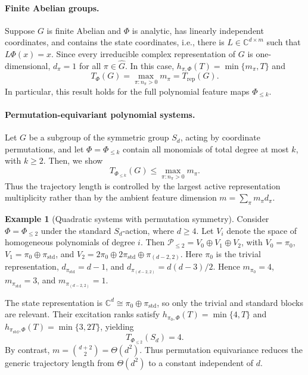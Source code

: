 \documentclass[11pt]{article}
\theoremstyle{plain}
\theoremstyle{definition}
\newtheorem{example}[theorem]{Example}
\theoremstyle{remark}
\begin{document}
\paragraph{Finite Abelian groups.}
Suppose \(G\) is finite Abelian and \(\Phi\) is analytic, has linearly
independent coordinates, and contains the state coordinates, i.e., there is
\(L\in\mathbb C^{d\times m}\) such that \(L\Phi(x)=x\). Since every
irreducible complex representation of \(G\) is one-dimensional,
\(d_\pi=1\) for all \(\pi\in\widehat G\). In this case, $h_{\pi,\Phi}(T)=\min\{m_\pi,T\}$ and
\[
T_\Phi(G)=\max_{\pi:n_\pi>0}m_\pi=T_{\mathrm{rep}}(G).
\]
In particular, this result holds for the full polynomial feature maps
\(\Phi_{\le k}\).

\paragraph{Permutation-equivariant polynomial systems.}
Let \(G\) be a subgroup of the symmetric group \(S_d\), acting by coordinate
permutations, and let \(\Phi=\Phi_{\le k}\) contain all monomials of total
degree at most \(k\), with \(k\ge2\). Then, we show
\[
T_{\Phi_{\le k}}(G)
\le
\max_{\pi:n_\pi>0}m_\pi.
\]
Thus the trajectory length is controlled by the largest active representation
multiplicity rather than by the ambient feature dimension
\(m=\sum_\pi m_\pi d_\pi\).

 
\begin{example}[Quadratic systems with permutation symmetry]
\label{ex:quadratic_permutation}
Consider \(\Phi=\Phi_{\le2}\) under the standard \(S_d\)-action, where
\(d\ge4\). Let \(V_i\) denote the space of homogeneous polynomials of degree
\(i\). Then \(\mathcal P_{\le2}=V_0\oplus V_1\oplus V_2\), with
\(V_0=\pi_0\), \(V_1=\pi_0\oplus\pi_{\mathrm{std}}\), and
\(V_2=2\pi_0\oplus2\pi_{\mathrm{std}}\oplus\pi_{(d-2,2)}\).
Here \(\pi_0\) is the trivial representation,
\(d_{\pi_{\mathrm{std}}}=d-1\), and
\(d_{\pi_{(d-2,2)}}=d(d-3)/2\). Hence
\(m_{\pi_0}=4\), \(m_{\pi_{\mathrm{std}}}=3\), and
\(m_{\pi_{(d-2,2)}}=1\).

The state representation is
\(\mathbb C^d\cong\pi_0\oplus\pi_{\mathrm{std}}\), so only the trivial and
standard blocks are relevant. Their excitation ranks satisfy
\(h_{\pi_0,\Phi}(T)=\min\{4,T\}\) and
\(h_{\pi_{\mathrm{std}},\Phi}(T)=\min\{3,2T\}\), yielding
\[
T_{\Phi_{\le2}}(S_d)=4.
\]
By contrast, \(m=\binom{d+2}{2}=\Theta(d^2)\). Thus permutation equivariance
reduces the generic trajectory length from \(\Theta(d^2)\) to a constant
independent of \(d\).
\end{example}
 
\end{document}
